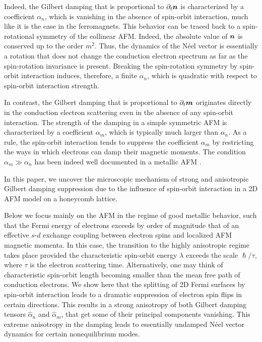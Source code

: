Indeed, the Gilbert damping that is proportional to $\partial_t\boldsymbol{n}$ is characterized by a coefficient $\alpha_n$, which is vanishing in the absence of spin-orbit interaction, much like it is the case in the ferromagnets. This behavior can be traced back to a spin-rotational symmetry of the collinear AFM. Indeed, the absolute value of $\boldsymbol{n}$ is conserved up to the order $m^2$. Thus, the dynamics of the N\'eel vector is essentially a rotation that does not change the conduction electron spectrum as far as the spin-rotation invariance is present. Breaking the spin-rotation symmetry by spin-orbit interaction induces, therefore, a finite $\alpha_n$, which is quadratic with respect to spin-orbit interaction strength.

In contrast, the Gilbert damping that is proportional to $\partial_t\boldsymbol{m}$ originates directly in the conduction electron scattering even in the absence of any spin-orbit interaction. The strength of the damping in a simple symmetric AFM is characterized by a coefficient $\alpha_m$, which is typically much larger than $\alpha_n$. As a rule, the spin-orbit interaction tends to suppress the coefficient $\alpha_m$ by restricting the ways in which electrons can damp their magnetic moments.  The condition $\alpha_m \gg \alpha_n$ has been indeed well documented in a metallic AFM \cite{PhysRevMaterials.1.061401, Mahfouzi2018a}. 

In this paper, we uncover the microscopic mechanism of strong and anisotropic Gilbert damping suppression due to the influence of spin-orbit interaction in a 2D AFM model on a honeycomb lattice. 

Below we focus mainly on the AFM in the regime of good metallic behavior, such that the Fermi energy of electrons exceeds by order of magnitude that of an effective $s$-$d$ exchange coupling between electron spins and localized AFM magnetic momenta.  In this case, the transition to the highly anisotropic regime takes place provided the characteristic spin-orbit energy $\lambda$ exceeds the scale $\hslash/\tau$, where $\tau$ is the electron scattering time. Alternatively, one may think of characteristic spin-orbit length becoming smaller than the mean free path of conduction electrons.  We show here that the splitting of 2D Fermi surfaces by spin-orbit interaction leads to a dramatic suppression of electron spin flips in certain directions. This results in a strong anisotropy of both Gilbert damping tensors $\hat{\alpha}_n$ and $\hat{\alpha}_m$, that get some of their principal components vanishing. This extreme anisotropy in the damping leads to essentially undamped N\'eel vector dynamics for certain nonequilibrium modes. 

